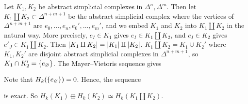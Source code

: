 \begin{example}
	Let \( K_1, K_2 \) be abstract simplicial complexes in \( \Delta^n, \Delta^m \).
	Then let \( K_1 \amalg K_2 \subset \Delta^{n+m+1} \) be the abstract simplicial complex where the vertices of \( \Delta^{n+m+1} \) are \( e_0, \dots, e_n, e_0', \dots, e_m' \), and we embed \( K_1 \) and \( K_2 \) into \( K_1 \amalg K_2 \) in the natural way.
	More precisely, \( e_I \in K_1 \) gives \( e_I \in K_1 \amalg K_2 \), and \( e_I \in K_2 \) gives \( e'_J \in K_1 \amalg K_2 \).
	Then \( \abs{K_1 \amalg K_2} = \abs{K_1} \amalg \abs{K_2} \).
	\( K_1 \amalg K_2 = K_1 \cup K_2' \) where \( K_1, K_2' \) are disjoint abstract simplicial complexes in \( \Delta^{n+m+1} \), so \( K_1 \cap K_2' = \qty{e_\varnothing} \).
	The Mayer--Vietoris sequence gives
	\begin{center}
	\end{center}
	Note that \( H_k(\qty{e_\varnothing}) = 0 \).
	Hence, the sequence
	\begin{center}
	\end{center}
	is exact.
	So \( H_k(K_1) \oplus H_k(K_2) \simeq H_k(K_1 \amalg K_2) \).
\end{example}

